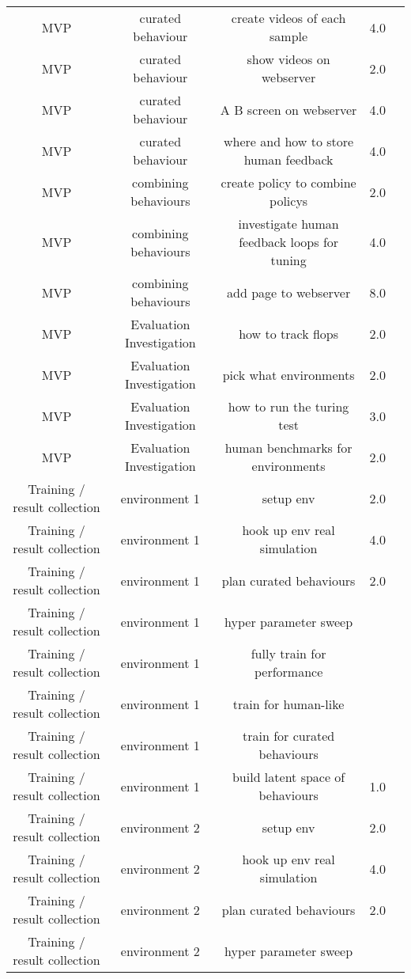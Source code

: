 \begin{longtable}{|c|c|c|c|c|}
	MVP & curated behaviour & create videos of each sample & 4.0 &  \\
	MVP & curated behaviour & show videos on webserver & 2.0 &  \\
	MVP & curated behaviour & A B screen on webserver & 4.0 &  \\
	MVP & curated behaviour & where and how to store human feedback & 4.0 &  \\
	MVP & combining behaviours & create policy to combine policys & 2.0 &  \\
	MVP & combining behaviours & investigate human feedback loops for tuning & 4.0 &  \\
	MVP & combining behaviours & add page to webserver & 8.0 &  \\
	MVP & Evaluation Investigation & how to track flops & 2.0 &  \\
	MVP & Evaluation Investigation & pick what environments & 2.0 &  \\
	MVP & Evaluation Investigation & how to run the turing test & 3.0 &  \\
	MVP & Evaluation Investigation & human benchmarks for environments & 2.0 &  \\
	Training / result collection & environment 1 & setup env & 2.0 &  \\
	Training / result collection & environment 1 & hook up env real simulation & 4.0 &  \\
	Training / result collection & environment 1 & plan curated behaviours & 2.0 &  \\
	Training / result collection & environment 1 & hyper parameter sweep &  &  \\
	Training / result collection & environment 1 & fully train for performance &  &  \\
	Training / result collection & environment 1 & train for human-like &  &  \\
	Training / result collection & environment 1 & train for curated behaviours &  &  \\
	Training / result collection & environment 1 & build latent space of behaviours & 1.0 &  \\
	Training / result collection & environment 2 & setup env & 2.0 &  \\
	Training / result collection & environment 2 & hook up env real simulation & 4.0 &  \\
	Training / result collection & environment 2 & plan curated behaviours & 2.0 &  \\
	Training / result collection & environment 2 & hyper parameter sweep &  &  \\

\end{longtable}
